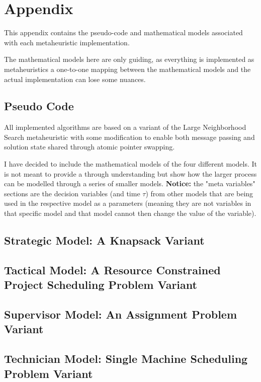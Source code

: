 \newpage
\section*{Appendix}
This appendix contains the pseudo-code and mathematical models associated with each metaheuristic implementation. 

The mathematical models here are only guiding, as everything is implemented as metaheuristics a one-to-one mapping
between the mathematical models and the actual implementation can lose some nuances.

\subsection*{Pseudo Code}

All implemented algorithms are based on a variant of the Large Neighborhood Search metaheuristic with some modification to enable both message
passing and solution state shared through atomic pointer swapping. 

\begin{figure}[H]
	
\end{figure}

I have decided to include the mathematical models of the four different models. It is not meant to provide a through understanding
but show how the larger process can be modelled through a series of smaller models. \textbf{Notice:} the "meta variables" sections are
the decision variables (and time $\tau$) from other models that are being used in the respective model as a parameters (meaning they are 
not variables in that specific model and that model cannot then change the value of the variable).

\newpage
\subsection*{Strategic Model: A Knapsack Variant}

\newpage
\subsection*{Tactical Model: A Resource Constrained Project Scheduling Problem Variant}

\newpage
\subsection*{Supervisor Model: An Assignment Problem Variant}

\newpage
\subsection*{Technician Model: Single Machine Scheduling Problem Variant}


